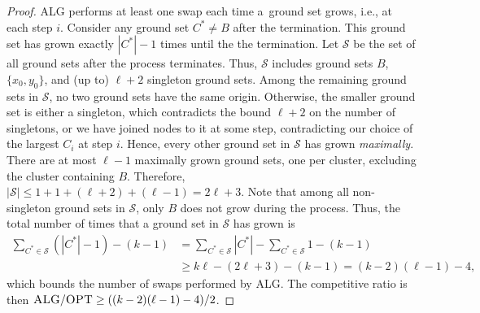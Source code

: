 \documentclass[a4paper,anonymous,USenglish]{lipics-v2019}
\newcommand{\OPT}{\textsc{OPT}\xspace}
\newcommand{\ALG}{\textsc{ALG}\xspace}
\begin{document}
\begin{proof}
	\ALG performs at least one swap each time a~ground set grows,
	i.e., at each step $i$.
	Consider any ground set $C^* \neq B$ after the termination.
	This ground set has grown exactly $|C^*|-1$ times until the the termination. 
	Let $\mathcal{S}$ be the set of all ground sets after the process terminates.
	Thus, $\mathcal{S}$ includes ground sets $B$,
	$\{x_0,y_0\}$,
	and (up to) $\ell+2$ singleton ground sets.
	Among the remaining ground sets in $\mathcal{S}$,
	no two ground sets have the same origin.
	Otherwise,
   the smaller ground set is either a singleton,
   which contradicts the bound $\ell+2$ on the number of singletons,
	or we have joined nodes to it at some step,
	contradicting our choice of the largest $C_i$ at step $i$.
	Hence, every  other ground set in
	$\mathcal{S}$ has grown \emph{maximally}.
	There are at most $\ell-1$ maximally grown ground sets,
	one per cluster,
	 excluding the cluster containing $B$. 
	Therefore,  $|\mathcal{S}| \leq 1 + 1 + (\ell+2)  + (\ell-1) = 2\ell+3$.
	Note that among all non-singleton ground sets in $\mathcal{S}$,
	 only $B$ does not grow during the process.
	 Thus,
    the total number of times that 
	a ground set in $\mathcal{S}$  has grown is
	\begin{align*}
	\sum_{C^* \in \mathcal{S} } (|C^*|-1) - (k-1) &= 
	\sum_{C^* \in \mathcal{S} } |C^*| - 
		\sum_{C^* \in \mathcal{S} } 1 - (k-1) \\
	&\geq  k  \ell - (2\ell+3) - (k-1) =  (k-2)(\ell-1) - 4,
	\end{align*}
	which bounds the number of swaps performed by \ALG.
	The competitive ratio is then
	$\ALG / \OPT \geq ((k-2)(\ell-1) - 4) / 2$.

\end{proof}
\end{document}
